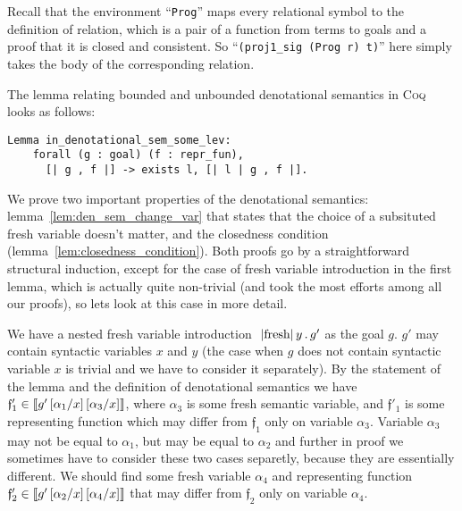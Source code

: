 Recall that the environment ``\lstinline[language=Coq]|Prog|'' maps every relational symbol to the definition of relation,
which is a pair of a function from terms to goals and a proof that it is closed and consistent.
So ``\lstinline[language=Coq]|(proj1_sig (Prog r) t)|'' here simply takes the body of the corresponding relation.

The lemma relating bounded and unbounded denotational semantics in \textsc{Coq} looks as follows:

\begin{lstlisting}[language=Coq] 
  Lemma in_denotational_sem_some_lev:
    forall (g : goal) (f : repr_fun),
      [| g , f |] -> exists l, [| l | g , f |].
\end{lstlisting}

We prove two important properties of the denotational semantics: lemma~\ref{lem:den_sem_change_var} that states that the choice of a subsituted fresh variable doesn't matter, and the closedness condition (lemma~\ref{lem:closedness_condition}). Both proofs go by a straightforward structural induction, except for the case of fresh variable introduction in the first lemma, which is actually quite non-trivial (and took the most efforts among all our proofs), so lets look at this case in more detail.

We have a nested fresh variable introduction $\mbox{\lstinline|fresh|}\,y\,.\,g'$ as the goal $g$. $g'$ may contain syntactic variables $x$ and $y$ (the case when $g$ does not contain syntactic variable $x$ is trivial and we have to consider it separately). By the statement of the lemma and the definition of denotational semantics we have ${\mathfrak f'_1} \in \llbracket{g'\,[\alpha_1/x]\,[\alpha_3/x]}\rrbracket$, where $\alpha_3$ is some fresh semantic variable, and ${\mathfrak f'_1}$ is some representing function which may differ from ${\mathfrak f_1}$ only on variable $\alpha_3$. Variable $\alpha_3$ may not be equal to $\alpha_1$, but may be equal to $\alpha_2$ and further in proof we sometimes have to consider these two cases separetly, because they are essentially different. We should find some fresh variable $\alpha_4$ and representing function ${\mathfrak f'_2} \in \llbracket{g'\,[\alpha_2/x]\,[\alpha_4/x]}\rrbracket$ that may differ from ${\mathfrak f_2}$ only on variable $\alpha_4$.

